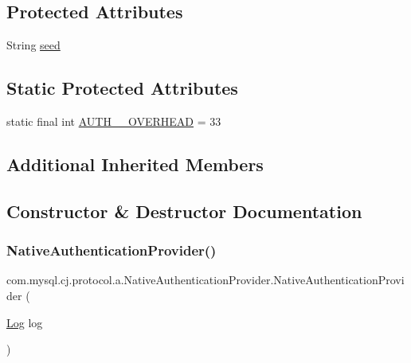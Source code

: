 \subsection*{Protected Attributes}
\begin{DoxyCompactItemize}
\item 
String \mbox{\hyperlink{classcom_1_1mysql_1_1cj_1_1protocol_1_1a_1_1_native_authentication_provider_a892979fa3727266691d4cbb0386adca2}{seed}}
\end{DoxyCompactItemize}
\subsection*{Static Protected Attributes}
\begin{DoxyCompactItemize}
\item 
static final int \mbox{\hyperlink{classcom_1_1mysql_1_1cj_1_1protocol_1_1a_1_1_native_authentication_provider_a49df77ded491c1f4b77a3f1dddeb33a5}{A\+U\+T\+H\+\_\+\_\+\+O\+V\+E\+R\+H\+E\+AD}} = 33
\end{DoxyCompactItemize}
\subsection*{Additional Inherited Members}


\subsection{Constructor \& Destructor Documentation}
\mbox{\label{classcom_1_1mysql_1_1cj_1_1protocol_1_1a_1_1_native_authentication_provider_a3b9853ff4d45808557e5566bdbcd5d5d}} 
\subsubsection{\texorpdfstring{Native\+Authentication\+Provider()}{NativeAuthenticationProvider()}}
{\footnotesize\ttfamily com.\+mysql.\+cj.\+protocol.\+a.\+Native\+Authentication\+Provider.\+Native\+Authentication\+Provider (\begin{DoxyParamCaption}\item[{\mbox{\hyperlink{interfacecom_1_1mysql_1_1cj_1_1log_1_1_log}{Log}}}]{log }\end{DoxyParamCaption})}



